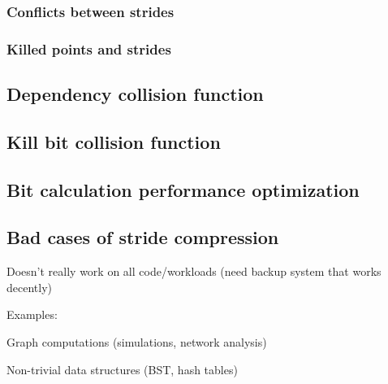 \documentclass[12pt,twoside]{reedthesis}
\begin{document}
		\subsubsection{Conflicts between strides}
		\subsubsection{Killed points and strides}
		
		\subsection{Dependency collision function}
		
		\subsection{Kill bit collision function}
		
		\subsection{Bit calculation performance optimization}
		
		\subsection{Bad cases of stride compression}
		
		Doesn’t really work on all code/workloads (need backup system that works decently)
		
		Examples:
		
		Graph computations (simulations, network analysis)
		
		Non-trivial data structures (BST, hash tables)
		
		
		
		
		
\end{document}
